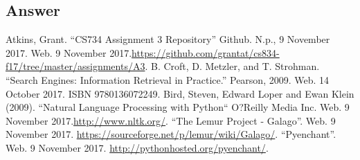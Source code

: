 \documentclass[letterpaper,11pt]{article}
\begin{document}
\begin{verbatim}

\end{verbatim}

\subsection*{Answer}


\clearpage


\clearpage



\begin{thebibliography}{9}
Atkins, Grant. ``CS734 Assignment 3 Repository'' Github. N.p., 9 November 2017. Web. 9 November 2017.\url{https://github.com/grantat/cs834-f17/tree/master/assignments/A3}.
B. Croft, D. Metzler, and T. Strohman. ``Search Engines: Information Retrieval in Practice.'' Pearson, 2009. Web. 14 October 2017. ISBN 9780136072249.
Bird, Steven, Edward Loper and Ewan Klein (2009). ``Natural Language Processing with Python`` O?Reilly Media Inc. Web. 9 November 2017.\url{http://www.nltk.org/}.
``The Lemur Project - Galago''. Web. 9 November 2017. \url{https://sourceforge.net/p/lemur/wiki/Galago/}.
``Pyenchant''. Web. 9 November 2017. \url{http://pythonhosted.org/pyenchant/}.
\end{thebibliography}
\end{document}
